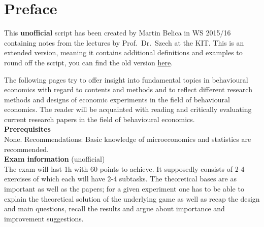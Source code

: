 

\chapter*{Preface}
This \textbf{unofficial} script has been created by Martin Belica in WS 2015/16 containing notes from the lectures by Prof.~Dr.~Szech at the KIT. This is an extended version, meaning it contains additional definitions and examples to round off the script, you can find the old version \href{http://goo.gl/EOC2Kh}{here}.

The following pages try to offer insight into fundamental topics in behavioural economics with regard to contents and methods and to reflect different research methods and designs of economic experiments in the field of behavioural economics. The reader will be acquainted with reading and critically evaluating current research papers in the field of behavioural economics. \\

\textbf{Prerequisites} \\
None. Recommendations: Basic knowledge of microeconomics and statistics are recommended. \\

\textbf{Exam information} (unofficial) \\
The exam will last 1h with 60 points to achieve. It supposedly consists of 2-4 exercises of which each will have 2-4 subtasks. The theoretical bases are as important as well as the papers; for a given experiment one has to be able to explain the theoretical solution of the underlying game as well as recap the design and main questions, recall the results and argue about importance and improvement suggestions.